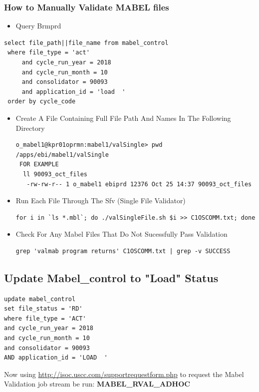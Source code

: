 \documentclass[12pt,twoside]{article}
\begin{document}
\subsubsection{How to Manually Validate MABEL files}
\label{sec:orgheadline54}
\begin{itemize}
\item Query Brmprd
\end{itemize}
\begin{verbatim}
select file_path||file_name from mabel_control
 where file_type = 'act'
     and cycle_run_year = 2018
     and cycle_run_month = 10
     and consolidator = 90093 
     and application_id = 'load  '
 order by cycle_code 
\end{verbatim}
\begin{itemize}
\item Create A File Containing Full File Path And Names In The Following Directory
\begin{verbatim}
o_mabel1@kpr01oprmn:mabel1/valSingle> pwd
/apps/ebi/mabel1/valSingle
 FOR EXAMPLE
  ll 90093_oct_files
   -rw-rw-r-- 1 o_mabel1 ebiprd 12376 Oct 25 14:37 90093_oct_files
\end{verbatim}
\item Run Each File Through The Sfv (Single File Validator)
\begin{verbatim}
for i in `ls *.mbl`; do ./valSingleFile.sh $i >> C1OSCOMM.txt; done
\end{verbatim}
\item Check For Any Mabel Files That Do Not Sucessfully Pass Validation
\begin{verbatim}
grep 'valmab program returns' C1OSCOMM.txt | grep -v SUCCESS 
\end{verbatim}
\end{itemize}
\subsection{Update Mabel\_control to "Load" Status}
\label{sec:orgheadline56}
\begin{verbatim}
update mabel_control
set file_status = 'RD'
where file_type = 'ACT'
and cycle_run_year = 2018
and cycle_run_month = 10
and consolidator = 90093 
AND application_id = 'LOAD  ' 
\end{verbatim}

Now using \url{http://isoc.uscc.com/supportrequestform.php} to request the Mabel Validation job stream be run: \textbf{MABEL\_RVAL\_ADHOC}  
\end{document}
